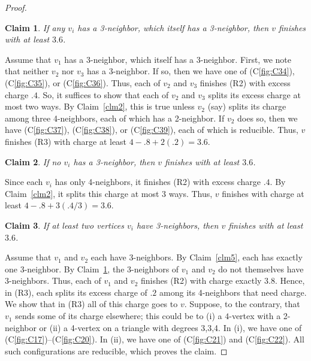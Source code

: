\documentclass[12pt]{article}
\theoremstyle{plain}
\newtheorem{clm}{Claim}
\theoremstyle{definition}
\theoremstyle{remark}
\begin{document}
\begin{proof}
	\begin{clm}
		If any $v_i$ has a 3-neighbor, which itself has a 3-neighbor, then $v$ finishes
		with at least $3.6$.
		\label{clm6}
	\end{clm}
	Assume that $v_1$ has a 3-neighbor, which itself has a 3-neighbor.
	First, we note that neither $v_2$ nor $v_3$ has a 3-neighbor.
	If so, then we have one of (C\ref{fig:C34}), (C\ref{fig:C35}), or
	(C\ref{fig:C36}).
	Thus, each of $v_2$ and $v_3$ finishes (R2) with excess charge $.4$.  So, it
	suffices to show that each of $v_2$ and $v_3$ splits its excess charge at most
	two ways.  By Claim~\ref{clm2}, this is true unless $v_2$ (say) splits its
	charge among three 4-neighbors, each of which has a 2-neighbor. 
	If $v_2$ does so, then we have 
	(C\ref{fig:C37}), (C\ref{fig:C38}), or (C\ref{fig:C39}), each
	of which is reducible.  
	Thus, $v$ finishes (R3) with charge at least $4-.8+2(.2)=3.6$.
	
	\begin{clm}
		If no $v_i$ has a 3-neighbor, then $v$ finishes with at least $3.6$.
		\label{clm7}
	\end{clm}
	Since each $v_i$ has only 4-neighbors, it finishes (R2) with excess charge $.4$.
	By Claim~\ref{clm2}, it splits this charge at most 3 ways.  Thus, $v$ finishes
	with charge at least $4-.8+3(.4/3)=3.6$.
	
	\begin{clm}
		If at least two vertices $v_i$ have 3-neighbors, then $v$ finishes with at least
		$3.6$.
	\end{clm}
	Assume that $v_1$ and $v_2$ each have 3-neighbors.  By Claim~\ref{clm5}, each
	has exactly one 3-neighbor.  By Claim~\ref{clm6}, the 3-neighbors of $v_1$ and
	$v_2$ do not themselves have 3-neighbors.  Thus, each of $v_1$ and $v_2$
	finishes (R2) with charge exactly $3.8$.  Hence, in (R3), each splits its
	excess charge of $.2$ among its 4-neighbors that need charge.  We show that in
	(R3) all of this charge goes to $v$.  Suppose, to the contrary, that $v_1$
	sends some of its charge elsewhere; this could be to (i) a $4$-vertex with a
	2-neighbor or (ii) a 4-vertex on a triangle with degrees 3,3,4.  In (i), we
	have one of (C\ref{fig:C17})--(C\ref{fig:C20}).  In (ii), we have one of
	(C\ref{fig:C21}) and (C\ref{fig:C22}).  All such configurations are reducible,
	which proves the claim.
	

\end{proof}
\end{document}
